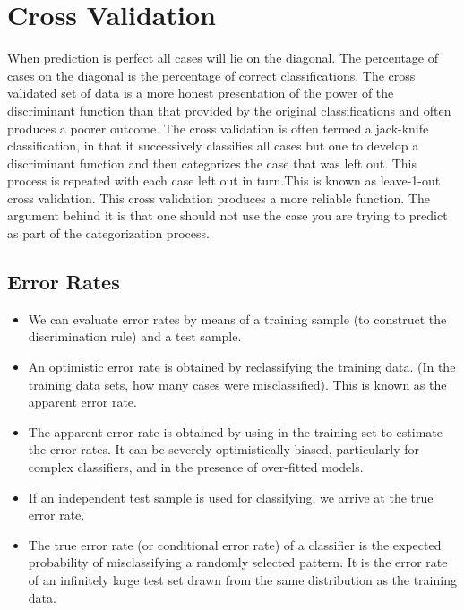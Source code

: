 \documentclass[a4paper,12pt]{article}
\begin{document}
\section*{ Cross Validation}
When prediction
is perfect all cases will lie on the diagonal. The percentage of cases on the
diagonal is the percentage of correct classifications. The cross validated set of
data is a more honest presentation of the power of the discriminant function
than that provided by the original classifications and often produces a poorer
outcome. The cross validation is often termed a jack-knife classification, in
that it successively classifies all cases but one to develop a discriminant
function and then categorizes the case that was left out. This process is
repeated with each case left out in turn.This is known as leave-1-out cross
validation.
This cross validation produces a more reliable function. The argument
behind it is that one should not use the case you are trying to predict as part
of the categorization process.
\subsection*{Error Rates}
\begin{itemize}
	\item We can evaluate error rates by means of a training sample (to construct the
	discrimination rule) and a test sample.
	\item An optimistic error rate is obtained by reclassifying the training data. (In
	the training data sets, how many cases were misclassified). This is known
	as the apparent error rate.
	\item The apparent error rate is obtained by using in the training set to estimate
	the error rates. It can be severely optimistically biased, particularly for
	complex classifiers, and in the presence of over-fitted models.
	\item If an independent test sample is used for classifying, we arrive at the true
	error rate.
	\item The true error rate (or conditional error rate) of a classifier is the
	expected probability of misclassifying a randomly selected pattern. It is the
	error rate of an infinitely large test set drawn from the same distribution as
	the training data.
\end{itemize}
\end{document}

